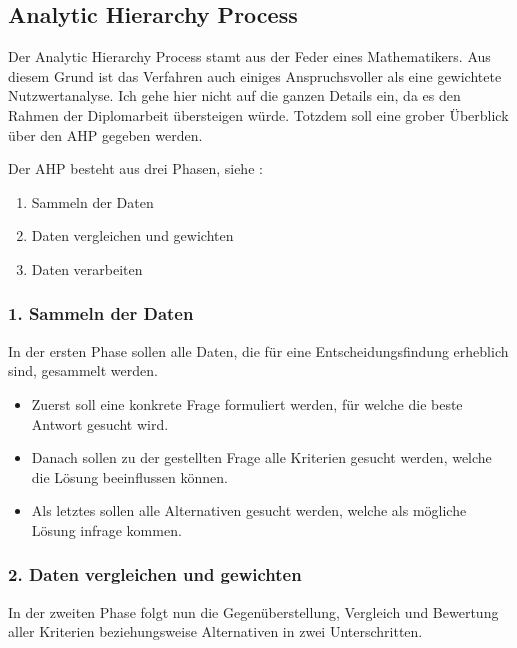   \subsection{Analytic Hierarchy Process}
  
  Der Analytic Hierarchy Process stamt aus der Feder eines Mathematikers. Aus
  diesem Grund ist das Verfahren auch einiges Anspruchsvoller als eine
  gewichtete Nutzwertanalyse. Ich gehe hier nicht auf die ganzen Details ein, da
  es den Rahmen der Diplomarbeit übersteigen würde. Totzdem soll eine grober
  Überblick über den \ac{AHP} gegeben werden.
  
  Der \ac{AHP} besteht aus drei Phasen, siehe \cite{AnalyticHierarchyProcess}: 
  
  \begin{enumerate}
    \item Sammeln der Daten
    \item Daten vergleichen und gewichten
    \item Daten verarbeiten
  \end{enumerate}
  
  \subsubsection{1. Sammeln der Daten}
  
  In der ersten Phase sollen alle Daten, die für eine Entscheidungsfindung
  erheblich sind, gesammelt werden.
  
  \begin{itemize}
    \item Zuerst soll eine konkrete Frage formuliert werden, für welche die
    beste Antwort gesucht wird.
    \item Danach sollen zu der gestellten Frage alle Kriterien  gesucht werden,
    welche die Lösung beeinflussen können.
    \item Als letztes sollen alle Alternativen gesucht werden, welche als
    mögliche Lösung infrage kommen.
  \end{itemize}
  
  \subsubsection{2. Daten vergleichen und gewichten}
  
  In der zweiten Phase folgt nun die Gegenüberstellung, Vergleich und Bewertung
  aller Kriterien beziehungsweise Alternativen in zwei Unterschritten.
  
